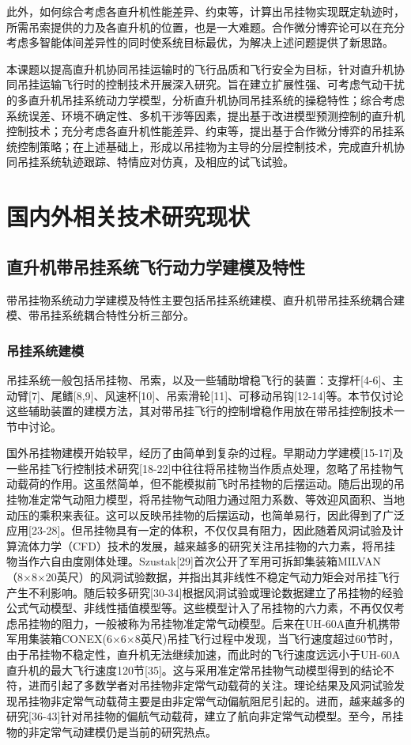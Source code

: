 此外，如何综合考虑各直升机性能差异、约束等，计算出吊挂物实现既定轨迹时，所需吊索提供的力及各直升机的位置，也是一大难题。合作微分博弈论可以在充分考虑多智能体间差异性的同时使系统目标最优，为解决上述问题提供了新思路。

本课题以提高直升机协同吊挂运输时的飞行品质和飞行安全为目标，针对直升机协同吊挂运输飞行时的控制技术开展深入研究。旨在建立扩展性强、可考虑气动干扰的多直升机吊挂系统动力学模型，分析直升机协同吊挂系统的操稳特性；综合考虑系统误差、环境不确定性、多机干涉等因素，提出基于改进模型预测控制的直升机控制技术；充分考虑各直升机性能差异、约束等，提出基于合作微分博弈的吊挂系统控制策略；在上述基础上，形成以吊挂物为主导的分层控制技术，完成直升机协同吊挂系统轨迹跟踪、特情应对仿真，及相应的试飞试验。

\section{国内外相关技术研究现状}
\subsection{直升机带吊挂系统飞行动力学建模及特性}
带吊挂物系统动力学建模及特性主要包括吊挂系统建模、直升机带吊挂系统耦合建模、带吊挂系统耦合特性分析三部分。
\subsubsection{吊挂系统建模}
吊挂系统一般包括吊挂物、吊索，以及一些辅助增稳飞行的装置：支撑杆[4-6]、主动臂[7]、尾鳍[8,9]、风速杯[10]、吊索滑轮[11]、可移动吊钩[12-14]等。本节仅讨论这些辅助装置的建模方法，其对带吊挂飞行的控制增稳作用放在带吊挂控制技术一节中讨论。

国外吊挂物建模开始较早，经历了由简单到复杂的过程。早期动力学建模[15-17]及一些吊挂飞行控制技术研究[18-22]中往往将吊挂物当作质点处理，忽略了吊挂物气动载荷的作用。这虽然简单，但不能模拟前飞时吊挂物的后摆运动。随后出现的吊挂物准定常气动阻力模型，将吊挂物气动阻力通过阻力系数、等效迎风面积、当地动压的乘积来表征。这可以反映吊挂物的后摆运动，也简单易行，因此得到了广泛应用[23-28]。但吊挂物具有一定的体积，不仅仅具有阻力，因此随着风洞试验及计算流体力学（CFD）技术的发展，越来越多的研究关注吊挂物的六力素，将吊挂物当作六自由度刚体处理。Szustak[29]首次公开了军用可拆卸集装箱MILVAN（8×8×20英尺）的风洞试验数据，并指出其非线性不稳定气动力矩会对吊挂飞行产生不利影响。随后较多研究[30-34]根据风洞试验或理论数据建立了吊挂物的经验公式气动模型、非线性插值模型等。这些模型计入了吊挂物的六力素，不再仅仅考虑吊挂物的阻力，一般被称为吊挂物准定常气动模型。后来在UH-60A直升机携带军用集装箱CONEX(6×6×8英尺)吊挂飞行过程中发现，当飞行速度超过60节时，由于吊挂物不稳定性，直升机无法继续加速，而此时的飞行速度远远小于UH-60A直升机的最大飞行速度120节[35]。这与采用准定常吊挂物气动模型得到的结论不符，进而引起了多数学者对吊挂物非定常气动载荷的关注。理论结果及风洞试验发现吊挂物非定常气动载荷主要是由非定常气动偏航阻尼引起的。进而，越来越多的研究[36-43]针对吊挂物的偏航气动载荷，建立了航向非定常气动模型。至今，吊挂物的非定常气动建模仍是当前的研究热点。

